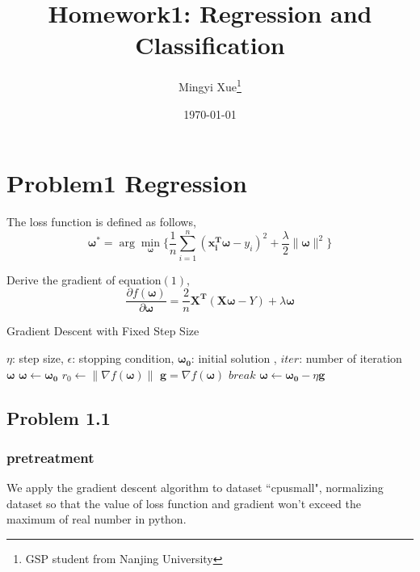 \documentclass[a4paper,11pt]{article}
\title{\Large\textbf{Homework1: Regression and Classification}}
\author{Mingyi Xue\footnote{GSP student from Nanjing University}}
\begin{document}
\date{\today}
\maketitle
\section{Problem1 Regression}
The loss function is defined as follows,\\
\begin{equation}
	\bm{\omega^{*}}=\arg\min_{\bm{\omega}}\{
	\frac{1}{n}\sum_{i=1}^{n}{(\bm{x_{i}^{T}}\bm{\omega}-y_{i})}^{2}+\frac{\lambda}{2}\|\bm{\omega}\|^{2}\}
\end{equation}
\par
Derive the gradient of equation$(1)$,\\
\begin{equation}
	\frac{\partial f(\bm{\omega})}{\partial\bm{\omega}}=\frac{2}{n}\bm{X^{T}}(\bm{X}\bm{\omega}-Y)+\lambda\bm{\omega}
\end{equation}
\par
\begin{algorithm} [H] 
	\caption{Gradient Descent with Fixed Step Size}  
	\begin{algorithmic}
		\Require $\eta$: step size, $\epsilon$: stopping condition, $\bm{\omega_{0}}$: initial solution , $iter$: number of iteration
		\Ensure  $\bm{\omega}$
		\State   $\bm{\omega}\gets\bm{\omega_{0}}$
		\State   $r_{0}\gets\|\nabla f(\bm{\omega})\|$
		\State $\bm{g}=\nabla f(\bm{\omega})$
		\State $break$
		\EndIf
		\State $\bm{\omega}\gets\bm{\omega_{0}}-\eta\bm{g}$
		\EndFor  
	\end{algorithmic}  
\end{algorithm}  
\par
\subsection*{Problem 1.1}
\subsubsection*{pretreatment}
We apply the gradient descent algorithm to dataset ``cpusmall", normalizing dataset so that the value of loss function and gradient won't exceed the maximum of real number in python. \par
\end{document}
